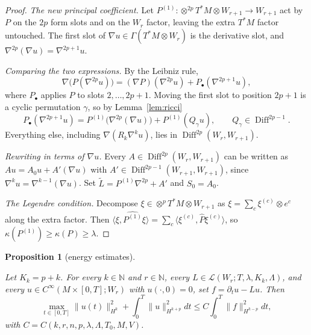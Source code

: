 \documentclass[11pt,reqno]{amsart}
\newtheorem{proposition}[theorem]{Proposition}
\theoremstyle{definition}
\theoremstyle{remark}
\newcommand{\N}{\mathbb{N}}
\newcommand{\Lcl}{\mathcal{L}}
\newcommand{\Diff}{\operatorname{Diff}}
\newcommand{\ip}[2]{\langle #1,#2\rangle}
\newcommand{\norm}[1]{\lVert #1\rVert}
\newcommand{\hatP}{\widehat{P}}
\newcommand{\lean}[1]{}
\newcommand{\uses}[1]{}
\numberwithin{equation}{section}
\begin{document}
\begin{proof}
\uses{lem:ricci, lem:legendre-basic}
\emph{The new principal coefficient.} Let $P^{(1)}\colon\otimes^{2p}T^*M\otimes W_{r+1}\to W_{r+1}$
act by $P$ on the $2p$ form slots and on the $W_r$ factor, leaving the extra $T^*M$ factor untouched.
The first slot of $\nabla u\in\Gamma(T^*M\otimes W_r)$ is the derivative slot, and
$\nabla^{2p}(\nabla u)=\nabla^{2p+1}u$.

\emph{Comparing the two expressions.} By the Leibniz rule,
\[
  \nabla\bigl(P(\nabla^{2p}u)\bigr)=(\nabla P)(\nabla^{2p}u)+P_\bullet(\nabla^{2p+1}u),
\]
where $P_\bullet$ applies $P$ to slots $2,\dots,2p+1$. Moving the first slot to position $2p+1$ is a cyclic
permutation $\gamma$, so by Lemma~\ref{lem:ricci}
\[
  P_\bullet(\nabla^{2p+1}u)=P^{(1)}\bigl(\nabla^{2p}(\nabla u)\bigr)+P^{(1)}(Q_\gamma u),\qquad
  Q_\gamma\in\Diff^{2p-1}.
\]
Everything else, including $\nabla(R_k\nabla^ku)$, lies in $\Diff^{2p}(W_r,W_{r+1})$.

\emph{Rewriting in terms of $\nabla u$.} Every $A\in\Diff^{2p}(W_r,W_{r+1})$ can be written as
$Au=A_0u+A'(\nabla u)$ with $A'\in\Diff^{2p-1}(W_{r+1},W_{r+1})$, since
$\nabla^ku=\nabla^{k-1}(\nabla u)$. Set $\tilde L=P^{(1)}\nabla^{2p}+A'$ and $S_0=A_0$.

\emph{The Legendre condition.} Decompose $\xi\in\otimes^pT^*M\otimes W_{r+1}$ as
$\xi=\sum_c\xi^{(c)}\otimes e^c$ along the extra factor. Then
$\ip{\xi}{\widehat{P^{(1)}}\xi}=\sum_c\ip{\xi^{(c)}}{\hatP\xi^{(c)}}$, so
$\kappa(P^{(1)})\ge\kappa(P)\ge\lambda$.
\end{proof}

\begin{proposition}[energy estimates]\label{prop:energy}
\lean{ShortTime.energy_estimate, ShortTime.LinearOp.energy_estimate_zero_of_garding, ShortTime.LinearOp.garding_lerp, ShortTime.hasDerivWithinAt_covGrad, ShortTime.energy_ode}
\uses{def:class, def:sobolev}
Let $K_k=p+k$. For every $k\in\N$ and $r\in\N$, every $L\in\Lcl(W_r;T,\lambda,K_k,\Lambda)$, and every
$u\in C^\infty(M\times[0,T];W_r)$ with $u(\cdot,0)=0$, set $f=\partial_tu-Lu$. Then
\begin{equation}\label{eq:Ek}
  \max_{t\in[0,T]}\norm{u(t)}_{H^k}^2+\int_0^T\norm{u}_{H^{k+p}}^2dt\le C\int_0^T\norm{f}_{H^{k-p}}^2dt,
\end{equation}
with $C=C(k,r,n,p,\lambda,\Lambda,T_0,M,V)$.
\end{proposition}
\end{document}

